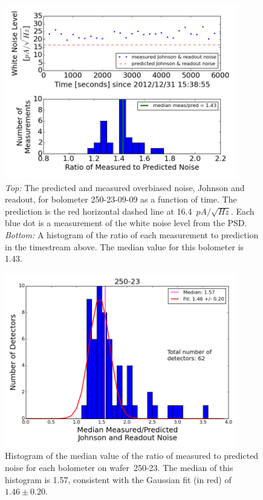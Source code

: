 \documentclass[../EBEXPaper2.tex]{subfiles}
\begin{document}
\begin{figure}[ht!]
\begin{center}
\includegraphics[height=3in]{images/board64_wire2_ch02_overbias_noise_vs_time}
\caption{{\it Top:} The predicted and measured overbiased noise, Johnson and readout, for bolometer 250-23-09-09 as a function of time. The prediction is the red horizontal dashed line at 16.4~$pA/\sqrt{Hz}$. Each blue dot is a measurement of the white noise level from the \ac{PSD}. {\it Bottom:} A histogram of the ratio of each measurement to prediction in the timestream above. The median value for this bolometer is 1.43.}
\label{fig:one_bolo_overbias_noise_vs_time}
\end{center}
\end{figure}

\begin{figure}[ht!]
\begin{center}
\includegraphics[height=3in]{images/250-23_overbias_meas_pred_noise_histogram.png}
\caption{Histogram of the median value of the ratio of measured to predicted noise for each bolometer on wafer~250-23. The median of this histogram 
is 1.57, consistent with the Gaussian fit (in red) of $1.46 \pm 0.20$.}
\label{fig:250-23_overbias_hist}
\end{center}
\end{figure}
\end{document}
